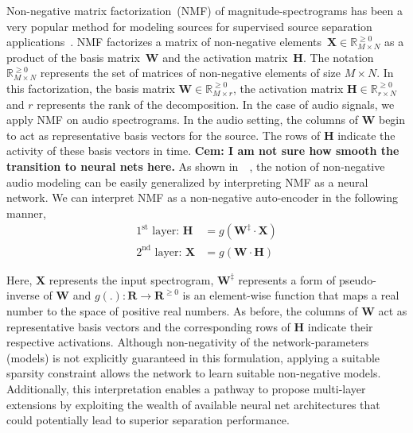 \documentclass{article}
\begin{document}
Non-negative matrix factorization~(NMF) of magnitude-spectrograms has been a very popular method for modeling sources for supervised source separation applications~\cite{smaragdis2014static, virtanen2015compositional}. NMF factorizes a matrix of non-negative elements~$\mathbf{X}\in \mathbb{R}_{M\times N}^{\geq0}$ as a product of the basis matrix~$\mathbf{W}$ and the activation matrix~$\mathbf{H}$. The notation $\mathbb{R}_{M \times N}^{\geq0}$ represents the set of matrices of non-negative elements of size $M \times N$. In this factorization, the basis matrix $\mathbf{W} \in \mathbb{R}_{M \times r}^{\geq{0}}$, the activation matrix $\mathbf{H} \in \mathbb{R}_{r \times N}^{\geq{0}}$ and $r$ represents the rank of the decomposition. In the case of audio signals, we apply NMF on audio spectrograms. In the audio setting, the columns of $\mathbf{W}$ begin to act as representative basis vectors for the source. The rows of $\mathbf{H}$ indicate the activity of these basis vectors in time. \textbf{Cem: I am not sure how smooth the transition to neural nets here.} As shown in~~\cite{smaragdis2017aneural}, the notion of non-negative audio modeling can be easily generalized by interpreting NMF as a neural network. We can interpret NMF as a non-negative auto-encoder in the following manner,
\begin{align}
    \text{$1^{\text{st}}$ layer:~}\mathbf{H} &= g(\mathbf{W^{\ddagger}} \cdot \mathbf{X}) \\
    \text{$2^{\text{nd}}$ layer:~}\mathbf{X} &= g(\mathbf{W} \cdot \mathbf{H})
    \label{eq:nmfae}
\end{align}

Here, $\mathbf{X}$ represents the input spectrogram, $\mathbf{W^{\ddagger}}$ represents a form of pseudo-inverse of $\mathbf{W}$ and $g(.):\mathbf{R}\rightarrow \mathbf{R}^{\geq0}$ is an element-wise function that maps a real number to the space of positive real numbers. As before, the columns of $\mathbf{W}$ act as representative basis vectors and the corresponding rows of $\mathbf{H}$ indicate their respective activations. Although non-negativity of the network-parameters (models) is not explicitly guaranteed in this formulation, applying a suitable sparsity constraint allows the network to learn suitable non-negative models. Additionally, this interpretation enables a pathway to propose multi-layer extensions by exploiting the wealth of available neural net architectures that could potentially lead to superior separation performance.
\end{document}
